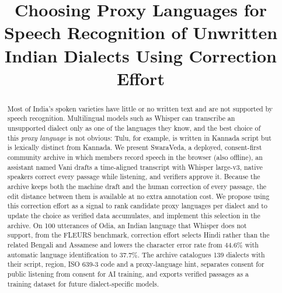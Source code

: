 \documentclass[conference]{IEEEtran}
\begin{document}
\title{Choosing Proxy Languages for Speech Recognition of Unwritten Indian Dialects Using Correction Effort}

\author{
}

\maketitle

\begin{abstract}
Most of India's spoken varieties have little or no written text and are not supported by speech recognition. Multilingual models such as Whisper can transcribe an unsupported dialect only as one of the languages they know, and the best choice of this \emph{proxy language} is not obvious: Tulu, for example, is written in Kannada script but is lexically distinct from Kannada. We present SwaraVeda, a deployed, consent-first community archive in which members record speech in the browser (also offline), an assistant named Vani drafts a time-aligned transcript with Whisper large-v3, native speakers correct every passage while listening, and verifiers approve it. Because the archive keeps both the machine draft and the human correction of every passage, the edit distance between them is available at no extra annotation cost. We propose using this correction effort as a signal to rank candidate proxy languages per dialect and to update the choice as verified data accumulates, and implement this selection in the archive. On 100 utterances of Odia, an Indian language that Whisper does not support, from the FLEURS benchmark, correction effort selects Hindi rather than the related Bengali and Assamese and lowers the character error rate from 44.6\% with automatic language identification to 37.7\%. The archive catalogues 139 dialects with their script, region, ISO 639-3 code and a proxy-language hint, separates consent for public listening from consent for AI training, and exports verified passages as a training dataset for future dialect-specific models.
\end{abstract}
\end{document}
